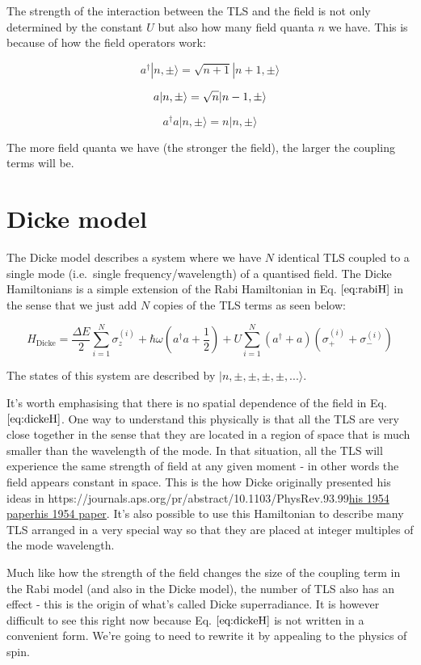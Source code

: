 \documentclass[
]{article}
\let\oldhref\href
\renewcommand{\href}[2]{\ifx#1\urlprefix\oldhref{#1}{#2}\else\uline{\oldhref{#1}{#2}}\fi}
\renewcommand{\[}{\begin{equation}}
\renewcommand{\]}{\end{equation}}
\begin{document}
The strength of the interaction between the TLS and the field is not
only determined by the constant \(U\) but also how many field quanta
\(n\) we have. This is because of how the field operators work:

\[
a^{\dagger} |n,\pm\rangle = \sqrt{n+1}|n+1,\pm\rangle
\label{eq:fieldcreate}
\]

\[
a |n,\pm\rangle = \sqrt{n}|n-1,\pm\rangle \\
\label{eq:fielddestroy}
\]

\[
a^{\dagger}a |n,\pm\rangle = n|n,\pm\rangle
\]

The more field quanta we have (the stronger the field), the larger the
coupling terms will be.

\section{Dicke model}\label{dicke-model}

The Dicke model describes a system where we have \(N\) identical TLS
coupled to a single mode (i.e.~single frequency/wavelength) of a
quantised field. The Dicke Hamiltonians is a simple extension of the
Rabi Hamiltonian in Eq. \(\ref{eq:rabiH}\) in the sense that we just add
\(N\) copies of the TLS terms as seen below:

\[
H_{\text{Dicke}} = \frac{\Delta E}{2} \sum_{i=1}^N \sigma_z^{(i)} +  \hbar\omega\left(a^{\dagger}a +\frac{1}{2}\right) + U \sum_{i=1}^N (a^\dagger + a) (\sigma_+^{(i)} + \sigma_-^{(i)})
\label{eq:dickeH}
\]

The states of this system are described by
\(|n, \pm, \pm, \pm, \pm, ... \rangle\).

It's worth emphasising that there is no spatial dependence of the field
in Eq. \(\ref{eq:dickeH}\). One way to understand this physically is
that all the TLS are very close together in the sense that they are
located in a region of space that is much smaller than the wavelength of
the mode. In that situation, all the TLS will experience the same
strength of field at any given moment - in other words the field appears
constant in space. This is the how Dicke originally presented his ideas
in \href{https://journals.aps.org/pr/abstract/10.1103/PhysRev.93.99}{his
1954 paper}. It's also possible to use this Hamiltonian to describe many
TLS arranged in a very special way so that they are placed at integer
multiples of the mode wavelength.

Much like how the strength of the field changes the size of the coupling
term in the Rabi model (and also in the Dicke model), the number of TLS
also has an effect - this is the origin of what's called Dicke
superradiance. It is however difficult to see this right now because Eq.
\(\ref{eq:dickeH}\) is not written in a convenient form. We're going to
need to rewrite it by appealing to the physics of spin.
\end{document}

